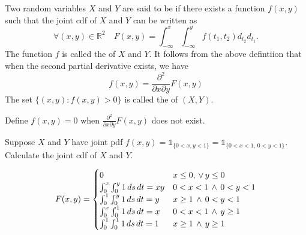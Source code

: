 \documentclass[notoc,notitlepage]{tufte-book}
\begin{document}
\begin{defn}
\label{defn:joint_continuous_rvs}
  Two random variables $X$ and $Y$ are said to be  if there exists a function $f(x, y)$ such that the joint cdf of $X$ and $Y$ can be written as
  \begin{equation*}
    \forall (x, y) \in \mathbb{R}^2 \quad F(x,y) = \int_{-\infty}^{x} \int_{-\infty}^{y} f(t_1, t_2) d_{t_2} d_{t_1}.
  \end{equation*}
  The function $f$ is called the  of $X$ and $Y$. It follows from the above defintiion that when the second partial derivative exists, we have
  \begin{equation*}
    f(x, y) = \frac{\partial^2}{\partial x \partial y} F(x, y)
  \end{equation*}
  The set $\{(x, y) : f(x, y) > 0 \}$ is called the  of $(X, Y)$.
\end{defn}

\begin{note}[Convention]
  Define $f(x, y) = 0$ when $\frac{\partial^2}{\partial x \partial y} F(x, y)$ does not exist.
\end{note}

\begin{eg}[Example 3.8]
  Suppose $X$ and $Y$ have joint pdf $f(x, y) = \mathbb{1}_{\{0 < x, y < 1\}} = \mathbb{1}_{\{0 < x < 1, \, 0 < y < 1 \}}$. Calculate the joint cdf of $X$ and $Y$.

  \begin{solution}
    \begin{equation*}
      F(x, y) = \begin{cases}
        0         & x \leq 0, \, \lor \, y \leq 0 \\
        \int_{0}^{x} \int_{0}^{y} 1 \dif{s} \dif{t} = xy & 0 < x < 1 \, \land \, 0 < y < 1 \\
        \int_{0}^{1} \int_{0}^{y} 1 \dif{s} \dif{t} = y  & x \geq 1 \, \land \, 0 < y < 1 \\
        \int_{0}^{x} \int_{0}^{1} 1 \dif{s} \dif{t} = x  & 0 < x < 1 \, \land \, y \geq 1 \\
        \int_{0}^{1} \int_{0}^{1} 1 \dif{s} \dif{t} = 1  & x \geq 1 \, \land \, y \geq 1
      \end{cases}
    \end{equation*}
  \end{solution}
\end{eg}
\end{document}
